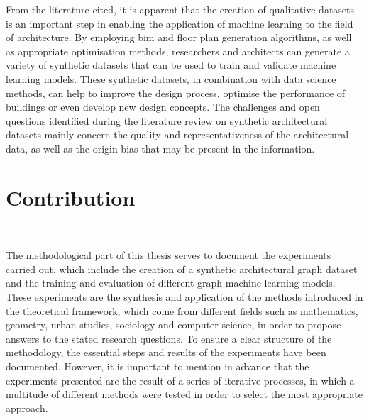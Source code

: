 \documentclass[a4paper, 12pt]{report}
\begin{document}
From the literature cited, it is apparent that the creation of qualitative datasets is an important step in enabling the application of machine learning to the field of architecture. By employing \acrlong{bim} and floor plan generation algorithms, as well as appropriate optimisation methods, researchers and architects can generate a variety of synthetic datasets that can be used to train and validate machine learning models. These synthetic datasets, in combination with data science methods, can help to improve the design process, optimise the performance of buildings or even develop new design concepts. The challenges and open questions identified during the literature review on synthetic architectural datasets mainly concern the quality and representativeness of the architectural data, as well as the \gls{origin bias} that may be present in the information.

\newpage
{}

\part{Contribution}\label{part:contribution}

\newpage \ \thispagestyle{empty}
\newpage\clearpage

The methodological part of this thesis serves to document the experiments carried out, which include the creation of a synthetic architectural graph dataset and the training and evaluation of different graph machine learning models. These experiments are the synthesis and application of the methods introduced in the theoretical framework, which come from different fields such as mathematics, geometry, urban studies, sociology and computer science, in order to propose answers to the stated research questions. To ensure a clear structure of the methodology, the essential steps and results of the experiments have been documented. However, it is important to mention in advance that the experiments presented are the result of a series of iterative processes, in which a multitude of different methods were tested in order to select the most appropriate approach.
\end{document}
